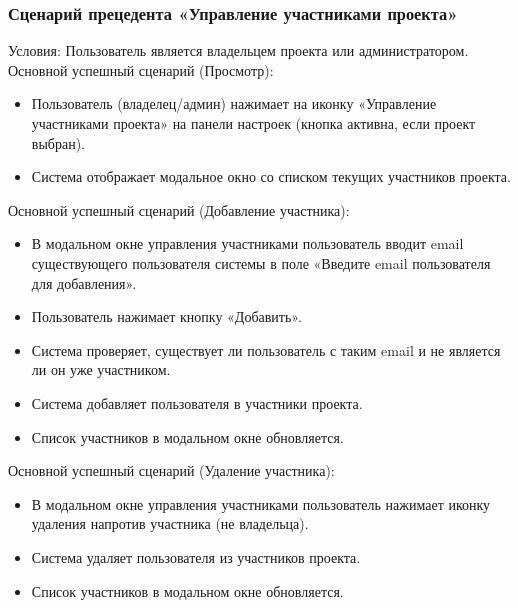 \subsubsection{Сценарий прецедента «Управление участниками проекта»}
Условия: Пользователь является владельцем проекта или администратором.
Основной успешный сценарий (Просмотр):
\begin{itemize}
	\item Пользователь (владелец/админ) нажимает на иконку «Управление участниками проекта» на панели настроек (кнопка активна, если проект выбран).
	\item Система отображает модальное окно со списком текущих участников проекта.
\end{itemize}
Основной успешный сценарий (Добавление участника):
\begin{itemize}
	\item В модальном окне управления участниками пользователь вводит email существующего пользователя системы в поле «Введите email пользователя для добавления».
	\item Пользователь нажимает кнопку «Добавить».
	\item Система проверяет, существует ли пользователь с таким email и не является ли он уже участником.
	\item Система добавляет пользователя в участники проекта.
	\item Список участников в модальном окне обновляется.
\end{itemize}
Основной успешный сценарий (Удаление участника):
\begin{itemize}
	\item В модальном окне управления участниками пользователь нажимает иконку удаления напротив участника (не владельца).
	\item Система удаляет пользователя из участников проекта.
	\item Список участников в модальном окне обновляется.
\end{itemize}

